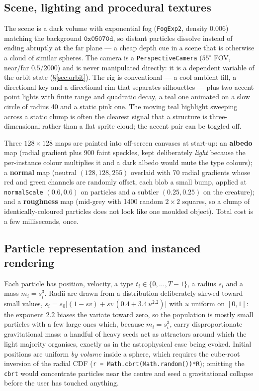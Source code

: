 \documentclass[10pt,a4paper]{article}
\newcommand{\code}[1]{\texttt{\small #1}}
\begin{document}
\subsection{Scene, lighting and procedural textures}
\label{sec:textures}

The scene is a dark volume with exponential fog (\code{FogExp2}, density $0.006$) matching the background
$\mathtt{0x05070d}$, so distant particles dissolve instead of ending abruptly at the far plane --- a cheap
depth cue in a scene that is otherwise a cloud of similar spheres. The camera is a
\code{PerspectiveCamera} ($55^\circ$ FOV, near/far $0.5$/$2000$) and is never manipulated directly: it is a
dependent variable of the orbit state (\S\ref{sec:orbit}). The rig is conventional --- a cool ambient fill,
a directional key and a directional rim that separates silhouettes --- plus two accent point lights with
finite range and quadratic decay, a teal one animated on a slow circle of radius 40 and a static pink one.
The moving teal highlight sweeping across a static clump is often the clearest signal that a structure is
three-dimensional rather than a flat sprite cloud; the accent pair can be toggled off.

Three $128\times128$ maps are painted into off-screen canvases at start-up: an \textbf{albedo} map (radial
gradient plus 900 faint speckles, kept deliberately \emph{light} because the per-instance colour multiplies
it and a dark albedo would mute the type colours); a \textbf{normal} map (neutral $(128,128,255)$ overlaid
with 70 radial gradients whose red and green channels are randomly offset, each blob a small bump, applied
at \code{normalScale} $(0.6,0.6)$ on particles and a subtler $(0.25,0.25)$ on the creature); and a
\textbf{roughness} map (mid-grey with 1400 random $2\times2$ squares, so a clump of identically-coloured
particles does not look like one moulded object). Total cost is a few milliseconds, once.

\subsection{Particle representation and instanced rendering}

Each particle has position, velocity, a type $t_i\in\{0,\dots,T-1\}$, a radius $s_i$ and a mass
$m_i=s_i^3$. Radii are drawn from a distribution deliberately skewed toward small values,
$s_i = s_0\big[(1-\mathit{sv}) + \mathit{sv}\,(0.4 + 3.4\,u^{2.2})\big]$ with $u$ uniform on $[0,1]$: the
exponent $2.2$ biases the variate toward zero, so the population is mostly small particles with a few large
ones which, because $m_i=s_i^3$, carry disproportionate gravitational mass: a handful of heavy seeds act as
attractors around which the light majority organises, exactly as in the astrophysical case being evoked.
Initial positions are uniform \emph{by volume} inside a
sphere, which requires the cube-root inversion of the radial CDF (\code{r = Math.cbrt(Math.random())*R});
omitting the \code{cbrt} would concentrate particles near the centre and seed a gravitational collapse
before the user has touched anything.
\end{document}
